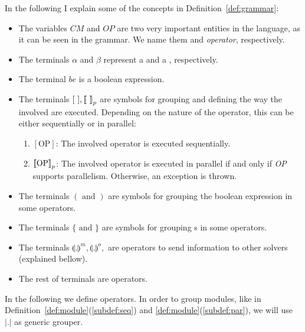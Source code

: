 In the following I explain some of the concepts in Definition~\ref{def:grammar}: 
\begin{itemize}
	\item The variables $CM$ and $OP$ are two very important entities in the language, as it can be seen in the grammar. We name them \cm{} and {\it operator}, respectively.
	\item The terminals $\alpha$ and $\beta$ represent a \om{} and a \opch{}, respectively.
	\item The terminal $be$ is a boolean expression.
	\item The terminals $[\text{ } ], \left\llbracket\text{ } \right\rrbracket_p$ are symbols for grouping and defining the way the involved \cms are executed. Depending on the nature of the operator, this can be either sequentially or in parallel:
	\begin{enumerate}\renewcommand{\labelitemi}{\scriptsize$\blacksquare$}
		\item $\left[\text{OP}\right]$: The involved operator is executed sequentially.
		\item $\left\llbracket\text{OP}\right\rrbracket_p$: The involved operator is executed in parallel if and only if \emph{OP} supports parallelism. Otherwise, an exception is thrown.
	\end{enumerate}
	\item The terminals $(\text{ and })$ are symbols for grouping the boolean expression in some operators.
	\item The terminals $\{\text{ and } \}$ are symbols for grouping \cm s in some operators.
	\item The terminals $\llparenthesis. \rrparenthesis^m, \llparenthesis.\rrparenthesis^o,$ are operators to send information to other solvers (explained bellow).
	\item The rest of terminals are \posl{} operators.
\end{itemize}

In the following we define \posl{} operators. In order to group modules, like in Definition~\ref{def:module}(\ref{subdef:seq}) and \ref{def:module}(\ref{subdef:par}), we will use $\left|.\right|$ as generic grouper. 

